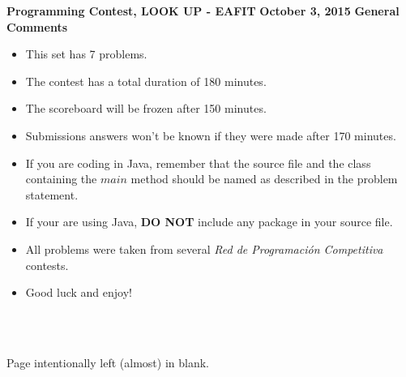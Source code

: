 \documentclass[12pt,letterpaper,oneside]{article}
\begin{document}
\thispagestyle{empty}
\begin{center}
  \LARGE\textbf{\center Programming Contest, LOOK UP - EAFIT}
  \LARGE\textbf{\center October 3, 2015}
  \vspace*{\fill}
  \LARGE\textbf{\center General Comments}
  \begin{itemize}
    \item This set has 7 problems.
    \item The contest has a total duration of 180 minutes.
    \item The scoreboard will be frozen after 150 minutes.
    \item Submissions answers won't be known if they were made after 170 minutes.
    \item If you are coding in Java, remember that the source file and the class containing the
          $main$ method should be named as described in the problem statement.
    \item If your are using Java, \textbf{DO NOT} include any package in your source file.
    \item All problems were taken from several \textit{Red de Programación Competitiva} contests.
    \item Good luck and enjoy!
  \end{itemize}
  \quad \\ \quad \\
  \vspace*{\fill}
\end{center}
\newpage

\thispagestyle{empty}
\vspace*{\fill}
\begin{center}
  \LARGE{Page intentionally left (almost) in blank.}
\end{center}
\vspace*{\fill}
\newpage








\end{document}
